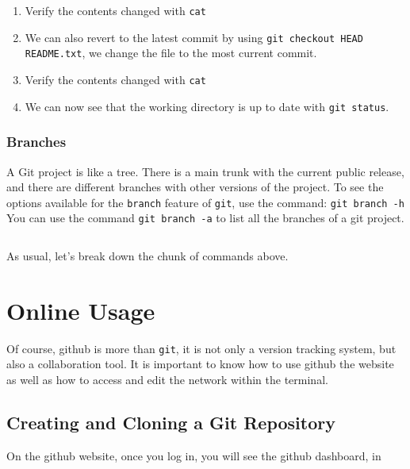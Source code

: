 \documentclass[11pt,fleqn]{article}
\theoremstyle{definition}
\begin{document}
\begin{enumerate}
\item Verify the contents changed with \verb|cat|

\item We can also revert to the latest commit by using \verb|git checkout HEAD README.txt|,
    we change the file to the most current commit.

\item Verify the contents changed with \verb|cat|

\item We can now see that the working directory is up to date with \verb|git status|.
\end{enumerate}

\subsubsection{Branches}
A Git project is like a tree. There is a main trunk with the current public
release, and there are different branches with other versions of the project. To
see the options available for the \verb|branch| feature of \verb|git|, use the
command: \texttt{git branch -h}\\
You can use the command \verb|git branch -a| to list all the branches of a git
project.

\begin{verbatim}
\end{verbatim}

As usual, let's break down the chunk of commands above.
\newpage
\section{Online Usage}
Of course, github is more than \verb|git|, it is not only a version tracking
system, but also a collaboration tool. It is important to know how to use github
the website as well as how to access and edit the network within the terminal.

\subsection{Creating and Cloning a Git Repository}
On the github website, once you log in, you will see the github dashboard, in 

\end{document}
